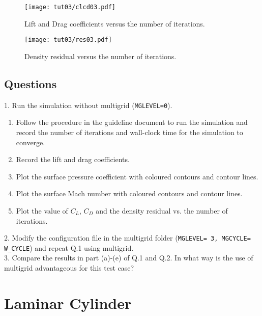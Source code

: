 \begin{figure}[ht]
    \centering
    \texttt{[image: tut03/clcd03.pdf]}
    \caption{Lift and Drag coefficients versus the number of iterations.}
    \label{fig3:clcdxlxs}
\end{figure}
\begin{figure}[H]
    \centering
    \texttt{[image: tut03/res03.pdf]}
    \caption{Density residual versus the number of iterations.}
    \label{fig3:res_vs_itr}
\end{figure}
\section{Questions}
1. Run the simulation without multigrid (\texttt{MGLEVEL=0}).
\begin{enumerate}[label=(\alph*)]
    \item Follow the procedure in the guideline document to run the simulation and record the number of iterations and wall-clock time for the simulation to converge.
    \item Record the lift and drag coefficients.
    \item Plot the surface pressure coefficient with coloured contours and contour lines.
    \item Plot the surface Mach number with coloured contours and contour lines.
    \item Plot the value of $C_L$, $C_D$ and the density residual vs. the number of iterations.
\end{enumerate}
2. Modify the configuration file in the multigrid folder (\texttt{MGLEVEL= 3, MGCYCLE= W\_CYCLE}) and repeat Q.1 using multigrid.\\
3. Compare the results in part (a)-(e) of Q.1 and Q.2. In what way is the use of multigrid advantageous for this test case?\\
\chapter{Laminar Cylinder}
\label{ch:Laminar Cylinder}
